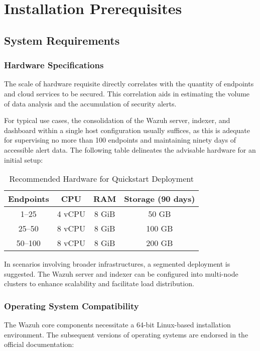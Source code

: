 \newpage
\section{Installation Prerequisites}
\subsection{System Requirements}
\subsubsection{Hardware Specifications}

The scale of hardware requisite directly correlates with the quantity of endpoints and cloud services to be secured. This correlation aids in estimating the volume of data analysis and the accumulation of security alerts.

For typical use cases, the consolidation of the Wazuh server, indexer, and dashboard within a single host configuration usually suffices, as this is adequate for supervising no more than 100 endpoints and maintaining ninety days of accessible alert data. The following table delineates the advisable hardware for an initial setup:

\begin{table}[H]
\centering
\begin{tabular}{|c|c|c|c|}
\hline
\textbf{Endpoints} & \textbf{CPU} & \textbf{RAM} & \textbf{Storage (90 days)} \\ \hline
1–25      & 4 vCPU    & 8 GiB & 50 GB             \\ \hline
25–50     & 8 vCPU    & 8 GiB & 100 GB            \\ \hline
50–100    & 8 vCPU    & 8 GiB & 200 GB            \\ \hline
\end{tabular}
\caption{Recommended Hardware for Quickstart Deployment}
\label{table:hardware_req}
\end{table}


In scenarios involving broader infrastructures, a segmented deployment is suggested. The Wazuh server and indexer can be configured into multi-node clusters to enhance scalability and facilitate load distribution.

\subsubsection{Operating System Compatibility}

The Wazuh core components necessitate a 64-bit Linux-based installation environment. The subsequent versions of operating systems are endorsed in the official documentation:

